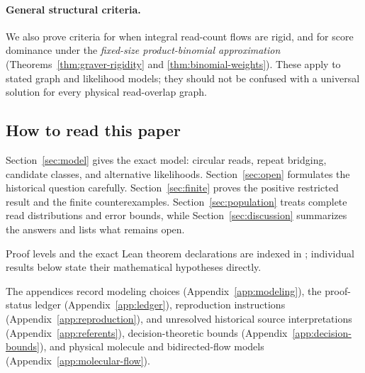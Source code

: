 \paragraph{General structural criteria.}
We also prove criteria for when integral read-count flows are
rigid, and for score dominance under the
\emph{fixed-size product-binomial approximation}
(Theorems~\ref{thm:graver-rigidity} and
\ref{thm:binomial-weights}). These apply to stated graph and
likelihood models; they should not be confused with a universal
solution for every physical read-overlap graph.

\subsection{How to read this paper}

Section~\ref{sec:model} gives the exact model: circular reads,
repeat bridging, candidate classes, and alternative likelihoods.
Section~\ref{sec:open} formulates the historical question carefully.
Section~\ref{sec:finite} proves the positive restricted result
and the finite counterexamples. Section~\ref{sec:population}
treats complete read distributions and error bounds, while
Section~\ref{sec:discussion} summarizes the answers and lists
what remains open.

Proof levels and the exact Lean theorem declarations are indexed in ; individual results below state their mathematical hypotheses directly.

The appendices record modeling choices
(Appendix~\ref{app:modeling}), the proof-status ledger
(Appendix~\ref{app:ledger}), reproduction instructions
(Appendix~\ref{app:reproduction}), and unresolved historical
source interpretations (Appendix~\ref{app:referents}),
decision-theoretic bounds (Appendix~\ref{app:decision-bounds}),
and physical molecule and bidirected-flow models
(Appendix~\ref{app:molecular-flow}).

